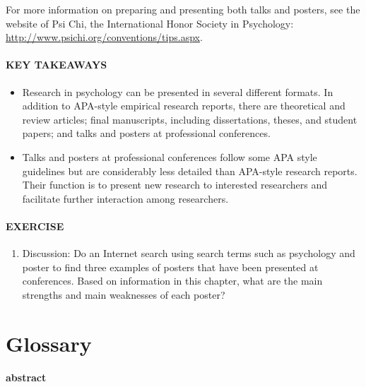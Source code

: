 \documentclass[
]{krantz}
\providecommand{\tightlist}{%
  \setlength{\itemsep}{0pt}\setlength{\parskip}{0pt}}
\begin{document}
For more information on preparing and presenting both talks and posters, see the website of Psi Chi, the International Honor Society in Psychology: \url{http://www.psichi.org/conventions/tips.aspx}.

\paragraph*{KEY TAKEAWAYS}\label{key-takeaways-31}

\begin{itemize}
\tightlist
\item
  Research in psychology can be presented in several different formats. In addition to APA-style empirical research reports, there are theoretical and review articles; final manuscripts, including dissertations, theses, and student papers; and talks and posters at professional conferences.
\item
  Talks and posters at professional conferences follow some APA style guidelines but are considerably less detailed than APA-style research reports. Their function is to present new research to interested researchers and facilitate further interaction among researchers.
\end{itemize}

\paragraph*{EXERCISE}\label{exercise-6}

\begin{enumerate}
\def\labelenumi{\arabic{enumi}.}
\tightlist
\item
  Discussion: Do an Internet search using search terms such as psychology and poster to find three examples of posters that have been presented at conferences. Based on information in this chapter, what are the main strengths and main weaknesses of each poster?
\end{enumerate}

\section{Glossary}\label{glossary-11}

\paragraph*{abstract}\label{abstract}
\end{document}
